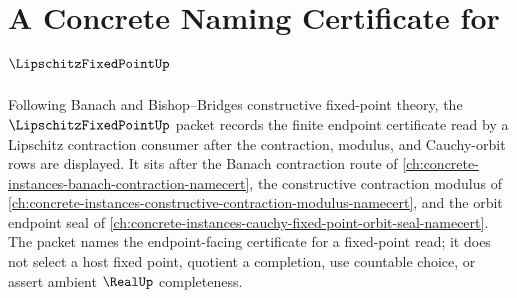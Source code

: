 \chapter{A Concrete Naming Certificate for $\LipschitzFixedPointUp$}
\label{ch:concrete-instances-lipschitz-fixed-point-namecert}

Following Banach and Bishop--Bridges constructive fixed-point theory, the $\LipschitzFixedPointUp$ packet records the finite endpoint certificate read by a Lipschitz contraction consumer after the contraction, modulus, and Cauchy-orbit rows are displayed. It sits after the Banach contraction route of \autoref{ch:concrete-instances-banach-contraction-namecert}, the constructive contraction modulus of \autoref{ch:concrete-instances-constructive-contraction-modulus-namecert}, and the orbit endpoint seal of \autoref{ch:concrete-instances-cauchy-fixed-point-orbit-seal-namecert}. The packet names the endpoint-facing certificate for a fixed-point read; it does not select a host fixed point, quotient a completion, use countable choice, or assert ambient $\RealUp$ completeness.

